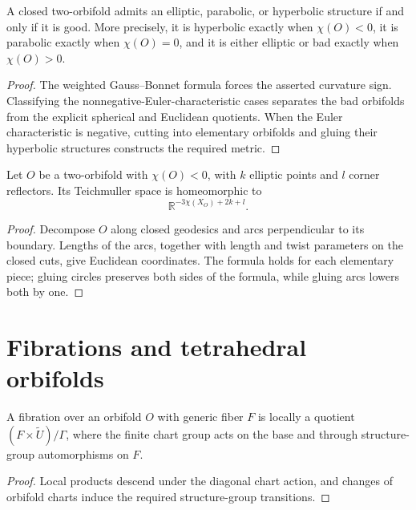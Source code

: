 \begin{theorem}
\label{thurston-ch13-two-orbifold-uniformization}

A closed two-orbifold admits an elliptic, parabolic, or hyperbolic structure
if and only if it is good.  More precisely, it is hyperbolic exactly when
$\chi(O)<0$, it is parabolic exactly when $\chi(O)=0$, and it is either
elliptic or bad exactly when $\chi(O)>0$.
\end{theorem}
\begin{proof}
\sketch The weighted Gauss--Bonnet formula forces the asserted curvature sign.
Classifying the nonnegative-Euler-characteristic cases separates the bad
orbifolds from the explicit spherical and Euclidean quotients.  When the Euler
characteristic is negative, cutting into elementary orbifolds and gluing their
hyperbolic structures constructs the required metric.
\end{proof}

\begin{corollary}
\label{thurston-ch13-teichmuller-dimension}

Let $O$ be a two-orbifold with $\chi(O)<0$, with $k$ elliptic points and $l$
corner reflectors.  Its Teichmuller space is homeomorphic to
\[
 \mathbb R^{-3\chi(X_O)+2k+l}.
\]
\end{corollary}
\begin{proof}
\sketch Decompose $O$ along closed geodesics and arcs perpendicular to its
boundary.  Lengths of the arcs, together with length and twist parameters on
the closed cuts, give Euclidean coordinates.  The formula holds for each
elementary piece; gluing circles preserves both sides of the formula, while
gluing arcs lowers both by one.
\end{proof}

\section{Fibrations and tetrahedral orbifolds}

\begin{definition}
\label{thurston-ch13-orbifold-fibration}

A fibration over an orbifold $O$ with generic fiber $F$ is locally a quotient
$(F\times\widetilde U)/\Gamma$, where the finite chart group acts on the base
and through structure-group automorphisms on $F$.
\end{definition}
\begin{proof}
\sketch Local products descend under the diagonal chart action, and changes of
orbifold charts induce the required structure-group transitions.
\end{proof}

